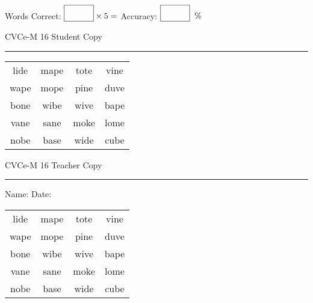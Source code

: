 \documentclass{memoir}
\begin{document}
\small

Words Correct: $\fbox{\phantom{\huge 100}} \times 5 = $ Accuracy: $\fbox{\phantom{\huge 100}}\;\; \%$ 

\vfill

\newpage


\footnotesize \noindent
CVCe-M 16 \hfill Student Copy
\smallskip
\hrule

\Large

\setlength{\tabcolsep}{14pt}
\def\arraystretch{2}

{\selectfont


\begin{vplace}[0.5]
\begin{center}
\begin{tabular}{cccc}
lide & mape & tote & vine \\
wape & mope & pine & duve \\
bone & wibe & wive & bape \\
vane & sane & moke & lome \\
nobe & base & wide & cube \\
\end{tabular}
\end{center}
\end{vplace}

}

\newpage

\footnotesize \noindent
CVCe-M 16 \hfill Teacher Copy
\smallskip
\hrule

\small

\vfill

\noindent
Name: \underline{\hspace{1.75in}} \hfill Date: \underline{\hspace{1in}}

\Large

{\selectfont


\begin{vplace}[0.5]
\begin{center}
\begin{tabular}{cccc}
lide & mape & tote & vine \\
wape & mope & pine & duve \\
bone & wibe & wive & bape \\
vane & sane & moke & lome \\
nobe & base & wide & cube \\
\end{tabular}
\end{center}
\end{vplace}



}
\end{document}

